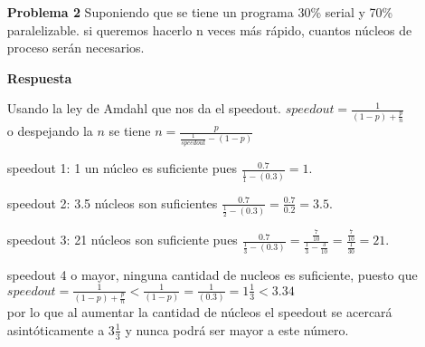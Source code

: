 \documentclass{article}
\begin{document}
\begin{enumerate}
\item[\bf{Problema 2}] Suponiendo que se tiene un programa 30\% serial y 70\% paralelizable. si queremos hacerlo n veces más rápido, cuantos núcleos de proceso serán necesarios.


\item[\bf{Respuesta}]

Usando la ley de Amdahl que nos da el speedout.
$ speedout = \frac{1}{(1-p) + \frac{p}{n}} $\\
o despejando la $n$ se tiene 
$ n = \frac{p}{\frac{1}{speedout} - (1-p)}$



speedout 1: 1 un núcleo es suficiente pues $  \frac{0.7}{\frac{1}{1} - (0.3)}  = 1 $.

speedout 2: 3.5 núcleos son suficientes  $ \frac{0.7}{\frac{1}{2} - (0.3)} = \frac{0.7}{0.2} = 3.5$.

speedout 3: 21 núcleos son suficiente pues $ \frac{0.7}{\frac{1}{3} - (0.3)} = \frac{\frac{7}{10}}{\frac{1}{3}-\frac{3}{10}} = \frac{\frac{7}{10}}{\frac{1}{30}} = 21$.

speedout 4 o mayor, ninguna cantidad de nucleos es suficiente, puesto que  $ speedout = \frac{1}{(1-p) + \frac{p}{n}}  < \frac{1}{(1-p)} = \frac{1}{(0.3)  } = 1\frac{1}{3}  < 3.34  $\\
por lo que al aumentar la cantidad de núcleos el speedout se acercará asintóticamente a $3\frac{1}{3}$ y nunca podrá ser mayor a este número.

\end{enumerate}
\end{document}
